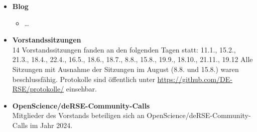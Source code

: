 \begin{itemize}
 \item[] \textbf{Blog}
 \begin{itemize}
  \item \dots
 \end{itemize}
 \item[] \textbf{Vorstandssitzungen}\\
  14 Vorstandssitzungen fanden an den folgenden Tagen statt: 11.1., 15.2., 21.3., 18.4., 22.4., 16.5., 18.6., 18.7., 8.8., 15.8., 19.9., 18.10., 21.11., 19.12
  Alle Sitzungen mit Ausnahme der Sitzungen im August (8.8. und 15.8.) waren beschlussfähig.
  Protokolle sind öffentlich unter \href{https://github.com/DE-RSE/protokolle/}{https://github.com/DE-RSE/protokolle/} einsehbar.
 \item[] \textbf{OpenScience/deRSE-Community-Calls}\\
 Mitglieder des Vorstands beteiligen sich an  OpenScience/deRSE-Community-Calls im Jahr 2024.
\end{itemize}




